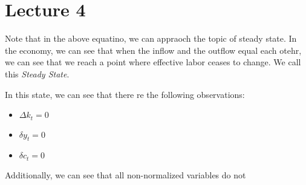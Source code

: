 \documentclass[11pt]{article}
\newtheorem{definition}{Definition}[section]
\newtheorem{note}{Note}[section]
\begin{document}
\section{Lecture 4}
Note that in the above equatino, we can appraoch the topic of steady state. In the economy, we can see that when the inflow and the outflow equal each otehr, we can see that we reach a point where effective labor ceases to change. We call this \emph{Steady State}. 


In this state, we can see that there re the following observations:
\begin{itemize}
    \item $\Delta k_t = 0$
    \item $\delta y_t = 0$
    \item $\delta c_t = 0$
\end{itemize}
Additionally, we can see that all non-normalized variables do not 








\end{document}
